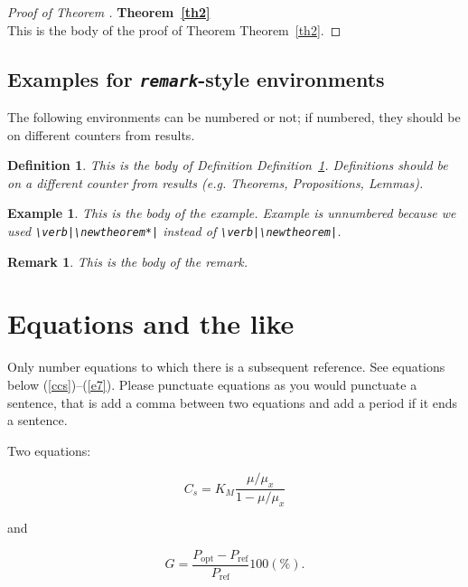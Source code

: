 \documentclass[qe,nameyear,final]{econsocart}
\newtheorem{definition}{Definition}[section]
\newtheorem{example}{Example}[section]
\newtheorem{remark}{Remark}[section]
\begin{document}
\begin{proof}[Proof of Theorem ]\textbf{Theorem~\ref{th2}}\\
This is the body of the proof of Theorem Theorem~\ref{th2}.

\end{proof}\subsection{Examples for \textit{\texttt{remark}}-style environments}

The following environments can be numbered or not; if numbered, they should be on different counters from results.

\begin{definition}\label{de1}This is the body of Definition Definition~\ref{de1}. Definitions should be on a different counter from results (e.g. Theorems, Propositions, Lemmas).

\end{definition}\begin{example}This is the body of the example. Example is unnumbered because we used \texttt{{\textbackslash}verb|{\textbackslash}newtheorem*|}
instead of \texttt{{\textbackslash}verb|{\textbackslash}newtheorem|}.

\end{example}\begin{remark}This is the body of the remark.

\end{remark}\section{Equations and the like}

Only number equations to which there is a subsequent reference.
See equations below (\ref{ccs})--(\ref{e7}). Please punctuate equations as you would punctuate a sentence, that is add a comma between two equations and add a period if it ends a sentence.

Two equations:

\begin{equation}
\label{ccs}
C_{s}  =  K_{M} \frac{\mu/\mu_{x}}{1-\mu/\mu_{x}}
\end{equation}

and

\begin{equation}
G = \frac{P_{\mathrm{opt}} - P_{\mathrm{ref}}}{P_{\mathrm{ref}}}  100(\%).
\end{equation}
\end{document}
